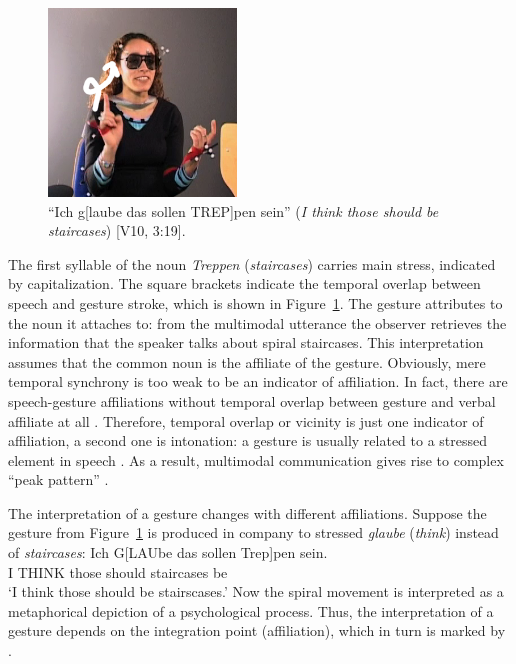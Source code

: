\documentclass[output=paper]{langsci/langscibook}
\begin{document}
\begin{figure}[tb]
  \includegraphics[width=5cm]{figures/treppen-2}
  \caption{\enquote{Ich g[laube das sollen TREP]pen sein} (\textit{I think those should be staircases}) [V10, 3:19].}
  \label{fig:staircases}
\end{figure}

The first syllable of the  noun \textit{Treppen} (\textit{staircases}) carries main stress, indicated by capitalization. 
%
The square brackets indicate the temporal overlap between speech and gesture stroke, which is shown in Figure~\ref{fig:staircases}.
%
The gesture attributes to the noun it attaches to: from the multimodal utterance the observer retrieves the information that the speaker talks about spiral staircases. 
%
This interpretation assumes that the common noun is the affiliate of the gesture.
%
Obviously, mere temporal synchrony is too weak to be an indicator of affiliation.
%
In fact, there are speech-gesture affiliations without temporal overlap between gesture and verbal affiliate at all \citep[e.g.][]{Luecking:Rieser:Stegmann:2004}.
%
Therefore, temporal overlap or vicinity is just one indicator of affiliation, a second one is intonation: a gesture is usually related to a stressed element in speech \citep{McClave:1994,Nobe:2000,Loehr:2004,Loehr:2007}. 
%
As a result, multimodal communication gives rise to complex \enquote{peak pattern} \citep{Tuite:1993,Loehr:2004,Jannedy:Mendoza-Denton:2005}.


The interpretation of a gesture changes with different affiliations. 
%
Suppose the gesture from Figure~\ref{fig:staircases} is produced in company to stressed \textit{glaube} (\textit{think}) instead of \textit{staircases}: 
%
\ea \label{ex:think}
\gll Ich G[LAUbe das sollen Trep]pen sein.\\
     I THINK those should staircases be \\
\glt \enquote*{I think those should be stairscases.}
\z
%
Now the spiral movement is interpreted as a metaphorical depiction of a psychological process.
%
Thus, the interpretation of a gesture depends on the integration point (affiliation),  which in turn is marked by .
\end{document}
